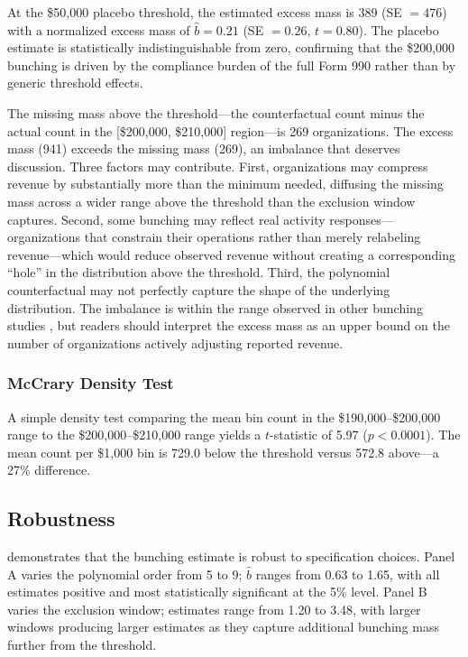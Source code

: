 \documentclass[12pt]{article}
\begin{document}
At the \$50,000 placebo threshold, the estimated excess mass is 389 (SE $= 476$) with a normalized excess mass of $\hat{b} = 0.21$ (SE $= 0.26$, $t = 0.80$). The placebo estimate is statistically indistinguishable from zero, confirming that the \$200,000 bunching is driven by the compliance burden of the full Form 990 rather than by generic threshold effects.



The missing mass above the threshold---the counterfactual count minus the actual count in the [\$200,000, \$210,000] region---is 269 organizations. The excess mass (941) exceeds the missing mass (269), an imbalance that deserves discussion. Three factors may contribute. First, organizations may compress revenue by substantially more than the minimum needed, diffusing the missing mass across a wider range above the threshold than the exclusion window captures. Second, some bunching may reflect real activity responses---organizations that constrain their operations rather than merely relabeling revenue---which would reduce observed revenue without creating a corresponding ``hole'' in the distribution above the threshold. Third, the polynomial counterfactual may not perfectly capture the shape of the underlying distribution. The imbalance is within the range observed in other bunching studies \citep{kleven2016bunching}, but readers should interpret the excess mass as an upper bound on the number of organizations actively adjusting reported revenue.

\subsubsection*{McCrary Density Test} A simple density test comparing the mean bin count in the \$190,000--\$200,000 range to the \$200,000--\$210,000 range yields a $t$-statistic of 5.97 ($p < 0.0001$). The mean count per \$1,000 bin is 729.0 below the threshold versus 572.8 above---a 27\% difference.

\subsection{Robustness}

 demonstrates that the bunching estimate is robust to specification choices. Panel A varies the polynomial order from 5 to 9; $\hat{b}$ ranges from 0.63 to 1.65, with all estimates positive and most statistically significant at the 5\% level. Panel B varies the exclusion window; estimates range from 1.20 to 3.48, with larger windows producing larger estimates as they capture additional bunching mass further from the threshold.
\end{document}
